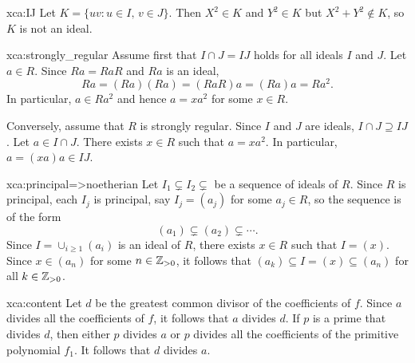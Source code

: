 \begin{sol}{xca:IJ}
    Let $K=\{uv:u\in I,\,v\in J\}$. Then
    $X^2\in K$ and $Y^2\in K$ but $X^2+Y^2\not\in K$, so $K$ is not an ideal.
\end{sol}

\begin{sol}{xca:strongly_regular}
    Assume first that $I\cap J=IJ$ holds for all ideals $I$ and $J$. 
    Let $a\in R$. Since $Ra=RaR$ and
    $Ra$ is an ideal, 
    \[
    Ra=(Ra)(Ra)=(RaR)a=(Ra)a=Ra^2.
    \]
    In particular, $a\in Ra^2$ and 
    hence $a=xa^2$ for some $x\in R$. 
    
    Conversely, assume that $R$ is strongly regular. Since $I$ and $J$ are
    ideals, $I\cap J\supseteq IJ$. 
    Let $a\in I\cap J$. There exists $x\in R$ such that
    $a=xa^2$. In particular, 
    $a=(xa)a\in IJ$.
\end{sol}


\begin{sol}{xca:principal=>noetherian}
	Let $I_1\subsetneq I_2\subsetneq$ be a sequence of ideals of $R$.  
	Since $R$ is principal, each $I_j$ is principal, 
	say $I_j=(a_j)$ for some $a_j\in R$, so the sequence is of the form
	\[
	(a_1)\subsetneq (a_2)\subsetneq\cdots.
	\]
	Since $I=\cup_{i\geq1}(a_i)$ is an ideal of $R$, 
	there exists $x\in R$ such that $I=(x)$. Since $x\in (a_n)$ for some $n\in\mathbb{Z}_{>0}$, 
	it follows that $(a_k)\subseteq I=(x)\subseteq (a_n)$ for all $k\in\mathbb{Z}_{>0}$. 
\end{sol}

\begin{sol}{xca:content}
	Let $d$ be 
	the greatest common divisor
	of the coefficients of $f$. 
	Since $a$ divides all the coefficients of $f$, it follows that $a$ divides $d$. If $p$ is a prime that
	divides $d$, then either $p$ divides $a$ or $p$ divides all the coefficients of the primitive
	polynomial $f_1$. It follows that $d$ divides $a$.    
\end{sol}

